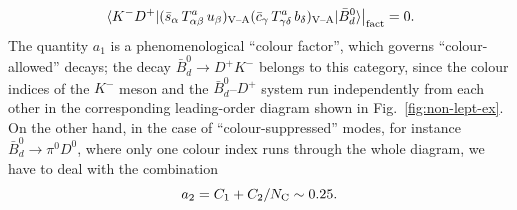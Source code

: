 \documentclass[12pt]{article}
\begin{document}
\begin{equation}
\left.\langle K^-D^+|
(\bar s_\alpha\, T^a_{\alpha\beta}\,u_\beta)_{\mbox{{\scriptsize 
V--A}}}(\bar c_\gamma 
\,T^a_{\gamma\delta}\,b_\delta)_{\mbox{{\scriptsize V--A}}}
|\bar B^0_d\rangle\right|_{\rm fact}=0.
\end{equation}
The quantity $a_1$ is a phenomenological ``colour factor'', 
which governs ``colour-allowed'' decays; the
decay $\bar B^0_d\to D^+K^-$ belongs to this category, since the 
colour indices of the $K^-$ meson and the $\bar B^0_d$--$D^+$ system 
run independently from each other in the corresponding leading-order 
diagram shown in Fig.~\ref{fig:non-lept-ex}. On the other hand, in the case 
of ``colour-suppressed'' modes, for instance $\bar B^0_d\to \pi^0D^0$, where only 
one colour index runs through the whole diagram, we have to deal with the combination
\begin{equation}\label{a2-def}
a_2=C_1+C_2/N_{\rm C}\sim0.25.
\end{equation}
\end{document}
